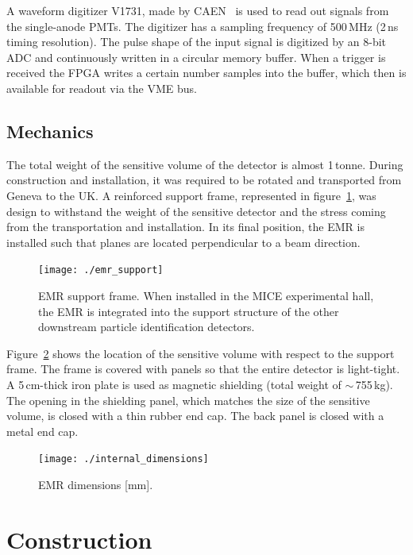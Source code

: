 \documentclass[a4paper,11pt]{article}
\begin{document}
A waveform digitizer V1731, made by CAEN~\cite{V1731} is used to read out signals from the single-anode PMTs. The digitizer has a sampling frequency of 500\,MHz (2\,ns timing resolution). The pulse shape of the input signal is digitized by an 8-bit ADC and continuously written in a circular memory
buffer. When a trigger is received the FPGA writes a certain number samples into the buffer, which
then is available for readout via the VME bus.

\subsection{Mechanics}\label{design:subsec:mechanics}

The total weight of the sensitive volume of the detector is almost 1\,tonne. During construction and installation, it was required to be rotated and transported from Geneva to the UK. A reinforced support frame, represented in figure~\ref{fig:emr_support},
was design to withstand the weight of the sensitive detector and the stress coming from the transportation and installation. In its
final position, the EMR is installed such that planes are located perpendicular to a beam direction. 

\begin{figure}[htp!]
 \centering 
 \texttt{[image: ./emr\_support]}
 \caption[EMR support frame]{EMR support frame. When installed in the MICE experimental hall, the EMR is integrated into the support structure of the other 
 downstream particle identification detectors.}
 \label{fig:emr_support}
\end{figure}

Figure~\ref{fig:internal_dimensions} shows the location of the sensitive volume with respect to the support frame. The frame is covered with panels so that
the entire detector is light-tight. A 5\,cm-thick iron plate is used as magnetic shielding (total weight of $\sim\,$755\,kg). The opening in the shielding
panel, which matches the size of the sensitive volume, is closed with a thin rubber end cap. The back panel is closed with a metal end cap.

\begin{figure}[htp!]
 \centering
 \texttt{[image: ./internal\_dimensions]}
 \caption[EMR dimensions]{EMR dimensions [mm].}
 \label{fig:internal_dimensions}
\end{figure}

\section{Construction}\label{sec:construction}
\end{document}
